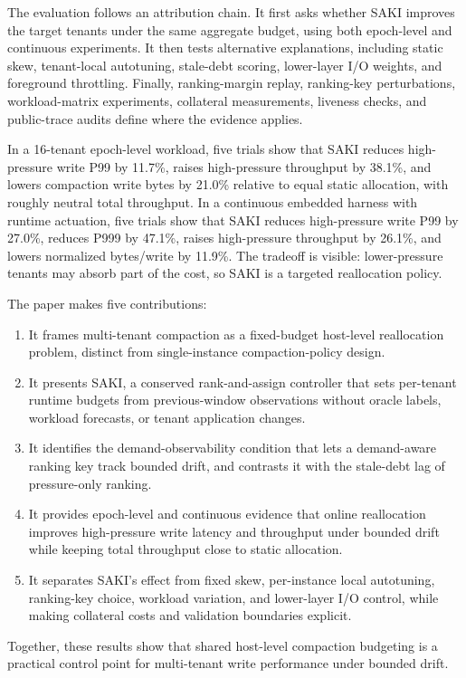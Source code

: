 The evaluation follows an attribution chain. It first asks whether SAKI improves
the target tenants under the same aggregate budget, using both epoch-level and
continuous \rocksdb experiments. It then tests alternative explanations,
including static skew, tenant-local autotuning, stale-debt scoring, lower-layer
I/O weights, and foreground throttling. Finally, ranking-margin replay,
ranking-key perturbations, workload-matrix experiments, collateral measurements,
liveness checks, and public-trace audits define where the evidence applies.

In a 16-tenant epoch-level workload, five trials show that SAKI reduces
high-pressure write P99 by 11.7\%, raises high-pressure throughput by 38.1\%,
and lowers compaction write bytes by 21.0\% relative to equal static allocation,
with roughly neutral total throughput. In a continuous embedded \rocksdb harness
with runtime actuation, five trials show that SAKI reduces high-pressure write
P99 by 27.0\%, reduces P999 by 47.1\%, raises high-pressure throughput by
26.1\%, and lowers normalized bytes/write by 11.9\%. The tradeoff is visible:
lower-pressure tenants may absorb part of the cost, so SAKI is a targeted
reallocation policy.

The paper makes five contributions:
\begin{enumerate}[leftmargin=1.2em,itemsep=0pt,topsep=2pt]
\item It frames multi-tenant \rocksdb compaction as a fixed-budget host-level
reallocation problem, distinct from single-instance compaction-policy design.
\item It presents SAKI, a conserved rank-and-assign controller that sets
per-tenant runtime budgets from previous-window observations without oracle
labels, workload forecasts, or tenant application changes.
\item It identifies the demand-observability condition that lets a
demand-aware ranking key track bounded drift, and contrasts it with the
stale-debt lag of pressure-only ranking.
\item It provides epoch-level and continuous evidence that online reallocation
improves high-pressure write latency and throughput under bounded drift while
keeping total throughput close to static allocation.
\item It separates SAKI's effect from fixed skew, per-instance local autotuning,
ranking-key choice, workload variation, and lower-layer I/O control, while
making collateral costs and validation boundaries explicit.
\end{enumerate}

Together, these results show that shared host-level compaction budgeting is a
practical control point for multi-tenant \rocksdb write performance under
bounded drift.
